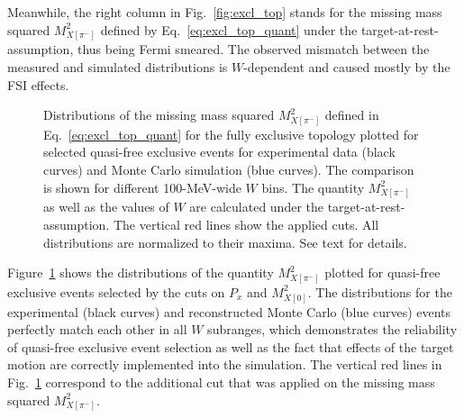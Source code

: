 Meanwhile, the right column in Fig.~\ref{fig:excl_top} stands for the missing mass squared $M_{X[\pi^{-}]}^{2}$ defined by Eq.~\eqref{eq:excl_top_quant} under the target-at-rest-assumption, thus being Fermi smeared. The observed mismatch between the measured and simulated distributions is $W$-dependent and caused mostly by the FSI effects. 
\begin{figure}[!ht]
\begin{center}
\end{center}
\caption{\small Distributions of the missing mass squared $M^{2}_{X[\pi^{-}]}$ defined in Eq.~\eqref{eq:excl_top_quant} for the fully exclusive topology plotted for selected quasi-free exclusive events for experimental data (black curves) and Monte Carlo simulation (blue curves). The comparison is shown for different 100-MeV-wide $W$ bins. The quantity $M^{2}_{X[\pi^{-}]}$ as well as the values of $W$ are calculated under the target-at-rest-assumption. The vertical red lines show the applied cuts. All distributions are normalized to their maxima. See text for details. }
\label{fig:excl_top_aft}
\end{figure}

Figure~\ref{fig:excl_top_aft} shows the distributions of the quantity $M_{X[\pi^{-}]}^{2}$ plotted for quasi-free exclusive events selected by the cuts on $P_{x}$ and $M^{2}_{X[0]}$. The distributions for the experimental (black curves) and reconstructed Monte Carlo (blue curves) events perfectly match each other in all $W$ subranges, which demonstrates the reliability of quasi-free exclusive event selection as well as the fact that effects of the target motion are correctly implemented into the simulation. The vertical red lines in Fig.~\ref{fig:excl_top_aft} correspond to the additional cut that was applied on the missing mass squared $M_{X[\pi^{-}]}^{2}$.

